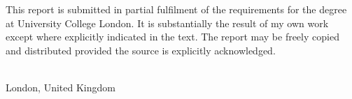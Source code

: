 \vspace{0.8cm}

\noindent This report is submitted in partial fulfilment of the requirements
for the \programme{} degree at University College London. It is substantially
the result of my own work except where explicitly indicated in the text. The
report may be freely copied and distributed provided the source is explicitly
acknowledged.

\vspace{2.4cm}
\begin{flushright}
    \authorName\\
    London, United Kingdom\\
    \submissionDate{}
\end{flushright}
